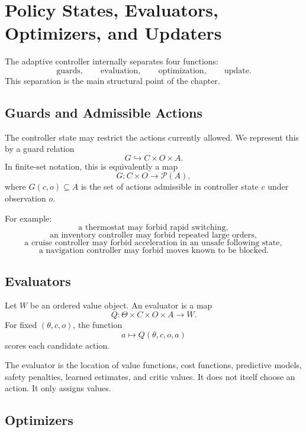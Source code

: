 \section{Policy States, Evaluators, Optimizers, and Updaters}
\label{sec:policy-evaluator-optimizer-updater}

The adaptive controller internally separates four functions:
\[
\text{guards},
\qquad
\text{evaluation},
\qquad
\text{optimization},
\qquad
\text{update}.
\]
This separation is the main structural point of the chapter.

\subsection{Guards and Admissible Actions}
\label{subsec:guards-admissible-actions}

The controller state may restrict the actions currently allowed.  We represent this by a guard
relation
\[
G\hookrightarrow C\times O\times A.
\]
In finite-set notation, this is equivalently a map
\[
G:C\times O\longrightarrow \mathcal P(A),
\]
where \(G(c,o)\subseteq A\) is the set of actions admissible in controller state \(c\) under
observation \(o\).

For example:
\[
\text{a thermostat may forbid rapid switching},
\]
\[
\text{an inventory controller may forbid repeated large orders},
\]
\[
\text{a cruise controller may forbid acceleration in an unsafe following state},
\]
\[
\text{a navigation controller may forbid moves known to be blocked}.
\]

\subsection{Evaluators}
\label{subsec:evaluators}

Let \(W\) be an ordered value object.  An evaluator is a map
\[
Q:\Theta\times C\times O\times A\longrightarrow W.
\]
For fixed \((\theta,c,o)\), the function
\[
a\longmapsto Q(\theta,c,o,a)
\]
scores each candidate action.

The evaluator is the location of value functions, cost functions, predictive models, safety
penalties, learned estimates, and critic values.  It does not itself choose an action.  It only
assigns values.

\subsection{Optimizers}
\label{subsec:optimizers}

